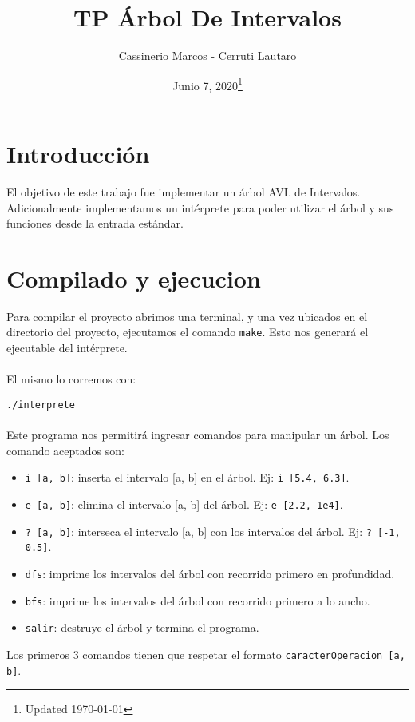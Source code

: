 \documentclass[]{article}
\begin{document}
	
\title{TP Árbol De Intervalos}
\author{Cassinerio Marcos - Cerruti Lautaro}
\date{Junio 7, 2020\footnote{Updated \today}}
\maketitle
\newpage

\section{Introducción}
El objetivo de este trabajo fue implementar un árbol AVL de Intervalos. Adicionalmente implementamos un intérprete para poder utilizar el árbol y sus funciones desde la entrada estándar. 

\section{Compilado y ejecucion}
Para compilar el proyecto abrimos una terminal, y una vez ubicados en el directorio del proyecto, ejecutamos el comando \verb|make|. Esto nos generará el ejecutable del intérprete.\\\\
El mismo lo corremos con: 

\verb|./interprete|
\\\\Este programa nos permitirá ingresar comandos para manipular un árbol. Los comando aceptados son:
 \begin{itemize}
 	\item \verb|i [a, b]|: inserta el intervalo [a, b] en el árbol. Ej: \verb|i [5.4, 6.3]|.
 	\item \verb|e [a, b]|: elimina el intervalo [a, b] del árbol. Ej: \verb|e [2.2, 1e4]|.
 	\item \verb|? [a, b]|: interseca el intervalo [a, b] con los intervalos del árbol. Ej: \verb|? [-1, 0.5]|.
 	\item \verb|dfs|: imprime los intervalos del árbol con recorrido primero en profundidad.
 	\item \verb|bfs|: imprime los intervalos del árbol con recorrido primero a lo ancho.
 	\item \verb|salir|: destruye el árbol y termina el programa.
 \end{itemize}
Los primeros 3 comandos tienen que respetar el formato \verb|caracterOperacion [a, b]|.
\end{document}
